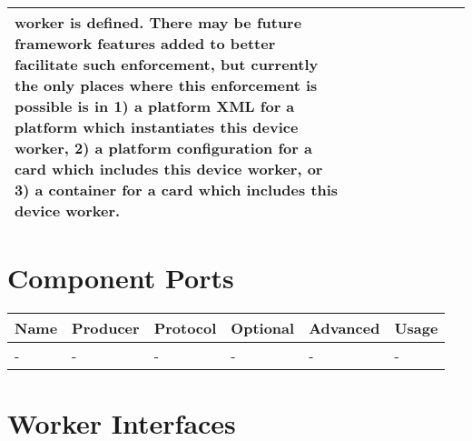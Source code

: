 \documentclass{article}
\begin{document}
\begin{landscape}
\begin{scriptsize}
\begin{longtable}{|p{2cm}|p{2.5cm}|p{1cm}|p{2cm}|p{2cm}|p{1.75cm}|p{2cm}|p{2.25cm}|p{5.04cm}|}
                         worker is defined. There may be future framework
                         features added to better facilitate such enforcement,
                         but currently the only places where this enforcement is
                         possible is in 1) a platform XML for a platform which
                         instantiates this device worker, 2) a platform
                         configuration for a card which includes this device
                         worker, or 3) a container for a card which includes
                         this device worker.
\\
			\hline
		\end{longtable}
	\end{scriptsize}

	\section*{Component Ports}
	\begin{scriptsize}
		\begin{tabular}{|p{2cm}|p{1.5cm}|p{4cm}|p{1.5cm}|p{1.5cm}|p{10.36cm}|}
			\hline
			\rowcolor{blue}
			Name & Producer & Protocol           & Optional & Advanced & Usage                  \\
			\hline
			-    & -        & -                  & -        & -        & - \\
			\hline
		\end{tabular}
	\end{scriptsize}

	\section*{Worker Interfaces}

\end{landscape}
\end{document}
